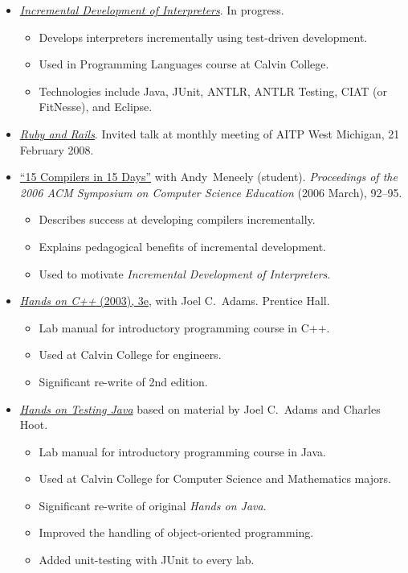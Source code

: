 \documentclass[letterpaper,10pt]{article}
\newcommand{\resitem}[1]{\item #1 \vspace{-2pt}}
\begin{document}
\begin{itemize}
	\item \href{http://cs.calvin.edu/curriculum/cs/214/jdfrens/Labs/}{\textit{Incremental Development of Interpreters}}.  In progress.
	\begin{itemize}
		\item Develops interpreters incrementally using test-driven development.
		\item Used in Programming Languages course at Calvin College.
		\item Technologies include Java, JUnit, ANTLR, ANTLR Testing, CIAT (or FitNesse), and Eclipse.
	\end{itemize}

	\item \href{http://norecess.org/frens-aitp-ruby-and-rails.pdf}{\textit{Ruby and Rails}}.  Invited talk at monthly meeting of AITP West Michigan, 21 February 2008.
	
	\item \href{http://doi.acm.org/10.1145/1121341.1121372}{``15 Compilers in 15 Days''} with Andy~Meneely (student).  \textit{Proceedings of the 2006 ACM Symposium on Computer Science Education} (2006 March), 92--95.
	  \begin{itemize}
		\resitem{Describes success at developing compilers incrementally.}
		\resitem{Explains pedagogical benefits of incremental development.}
		\resitem{Used to motivate \textit{Incremental Development of Interpreters}.}
  	\end{itemize}
	
	\item \href{http://cs.calvin.edu/books/c++/intro/3e/HandsOnC++/}{\textit{Hands on C++} (2003), 3e}, with Joel C.\ Adams.  Prentice Hall.
	  \begin{itemize}
	    \resitem{Lab manual for introductory programming course in C++.}
	    \resitem{Used at Calvin College for engineers.}
	  	\resitem{Significant re-write of 2nd edition.}
	  \end{itemize}
	  
	\item \href{http://cs.calvin.edu/curriculum/cs/108/HoTJ/}{\textit{Hands on Testing Java}} based on material by Joel C.\ Adams and Charles Hoot.
	  \begin{itemize}
	    \resitem{Lab manual for introductory programming course in Java.}
	    \resitem{Used at Calvin College for Computer Science and Mathematics majors.}
	  	\resitem{Significant re-write of original \textit{Hands on Java}.}
			\resitem{Improved the handling of object-oriented programming.}
			\resitem{Added unit-testing with JUnit to every lab.}
	  \end{itemize}
  
\end{itemize}
\end{document}
